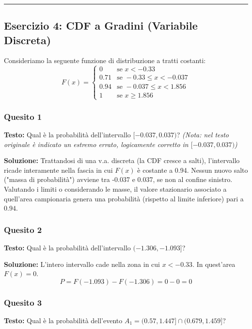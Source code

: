 \documentclass[12pt, a4paper]{article}
\begin{document}
\vspace{0.5cm}\hrule\vspace{0.5cm}

\subsection*{Esercizio 4: CDF a Gradini (Variabile Discreta)}
Consideriamo la seguente funzione di distribuzione a tratti costanti:
$$
F(x) = 
\begin{cases} 
0 & \text{se } x < -0.33 \\
0.71 & \text{se } -0.33 \le x < -0.037 \\
0.94 & \text{se } -0.037 \le x < 1.856 \\
1 & \text{se } x \ge 1.856
\end{cases}
$$

\subsubsection*{Quesito 1}
\textbf{Testo:} Qual è la probabilità dell'intervallo $[-0.037, 0.037)$? 
\textit{(Nota: nel testo originale è indicato un estremo errato, logicamente corretto in $[-0.037, 0.037)$)}

\textbf{Soluzione:}
Trattandosi di una v.a. discreta (la CDF cresce a salti), l'intervallo ricade interamente nella fascia in cui $F(x)$ è costante a 0.94. Nessun nuovo salto ("massa di probabilità") avviene tra -0.037 e 0.037, se non al confine sinistro. Valutando i limiti o considerando le masse, il valore stazionario associato a quell'area campionaria genera una probabilità (rispetto al limite inferiore) pari a $0.94$.

\subsubsection*{Quesito 2}
\textbf{Testo:} Qual è la probabilità dell'intervallo $(-1.306, -1.093]$?

\textbf{Soluzione:}
L'intero intervallo cade nella zona in cui $x < -0.33$. In quest'area $F(x) = 0$.
$$P = F(-1.093) - F(-1.306) = 0 - 0 = 0$$

\subsubsection*{Quesito 3}
\textbf{Testo:} Qual è la probabilità dell'evento $A_1 = (0.57, 1.447] \cap (0.679, 1.459]$?
\end{document}
